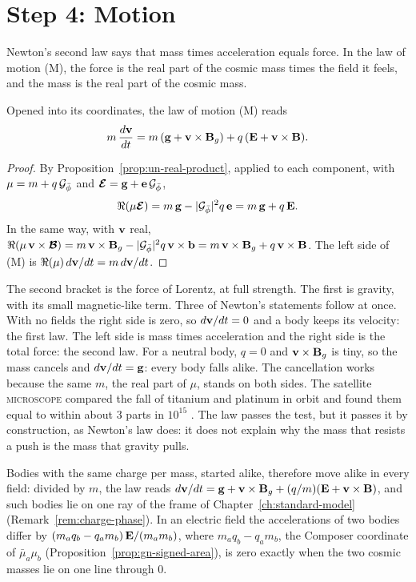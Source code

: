 \section{Step 4: Motion}\label{sec:un-motion}

Newton's second law says that mass times acceleration equals force. In the law of motion (M), the force is the real part of the cosmic mass times the field it feels, and the mass is the real part of the cosmic mass.

\begin{proposition}\label{prop:un-lorentz}
Opened into its coordinates, the law of motion (M) reads
\[
m\,\frac{d\mathbf{v}}{dt} = m\,(\mathbf{g} + \mathbf{v}\times\mathbf{B}_g) + q\,(\mathbf{E} + \mathbf{v}\times\mathbf{B}) .
\]
\end{proposition}

\begin{proof}
By Proposition~\ref{prop:un-real-product}, applied to each component, with $\mu = m + q\,\mathcal{G}_{\bar{\phi}}$ and $\boldsymbol{\mathcal{E}} = \mathbf{g} + \mathbf{e}\,\mathcal{G}_{\bar{\phi}}$,
\[
\Re(\mu\boldsymbol{\mathcal{E}}) = m\,\mathbf{g} - |\mathcal{G}_{\bar{\phi}}|^2 q\,\mathbf{e} = m\,\mathbf{g} + q\,\mathbf{E} .
\]
In the same way, with $\mathbf{v}$ real, $\Re(\mu\,\mathbf{v}\times\boldsymbol{\mathcal{B}}) = m\,\mathbf{v}\times\mathbf{B}_g - |\mathcal{G}_{\bar{\phi}}|^2 q\,\mathbf{v}\times\mathbf{b} = m\,\mathbf{v}\times\mathbf{B}_g + q\,\mathbf{v}\times\mathbf{B}$. The left side of (M) is $\Re(\mu)\,d\mathbf{v}/dt = m\,d\mathbf{v}/dt$.
\end{proof}

The second bracket is the force of Lorentz, at full strength. The first is gravity, with its small magnetic-like term. Three of Newton's statements follow at once. With no fields the right side is zero, so $d\mathbf{v}/dt = 0$ and a body keeps its velocity: the first law. The left side is mass times acceleration and the right side is the total force: the second law. For a neutral body, $q = 0$ and $\mathbf{v}\times\mathbf{B}_g$ is tiny, so the mass cancels and $d\mathbf{v}/dt = \mathbf{g}$: every body falls alike. The cancellation works because the same $m$, the real part of $\mu$, stands on both sides. The satellite \textsc{microscope} compared the fall of titanium and platinum in orbit and found them equal to within about $3$ parts in $10^{15}$ \citep{Touboul2022}. The law passes the test, but it passes it by construction, as Newton's law does: it does not explain why the mass that resists a push is the mass that gravity pulls.

Bodies with the same charge per mass, started alike, therefore move alike in every field: divided by $m$, the law reads $d\mathbf{v}/dt = \mathbf{g} + \mathbf{v}\times\mathbf{B}_g + (q/m)(\mathbf{E} + \mathbf{v}\times\mathbf{B})$, and such bodies lie on one ray of the frame of Chapter~\ref{ch:standard-model} (Remark~\ref{rem:charge-phase}). In an electric field the accelerations of two bodies differ by $(m_a q_b - q_a m_b)\,\mathbf{E}/(m_a m_b)$, where $m_a q_b - q_a m_b$, the Composer coordinate of $\bar{\mu}_a\mu_b$ (Proposition~\ref{prop:gn-signed-area}), is zero exactly when the two cosmic masses lie on one line through $0$.

